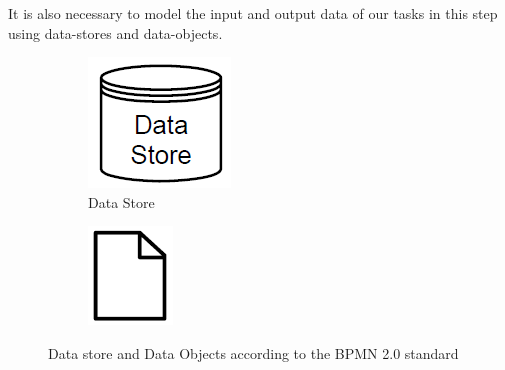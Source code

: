 It is also necessary to model the input and output data of our tasks in this step using \gls{data-store}s and \gls{data-object}s. 

\begin{figure}[H]
	\centering
	\begin{subfigure}[b]{0.18\columnwidth}
	\centering
	\includegraphics[width=0.9\columnwidth]{graphics/data-store}
	\caption{Data Store} 
	\label{fig:datastore} 
	\end{subfigure}
	\begin{subfigure}[b]{0.18\columnwidth}
		\centering
		\includegraphics[width=0.8\columnwidth]{graphics/data-object}
		\label{fig:dataobject}
	\end{subfigure}
	\caption{Data store and Data Objects according to the BPMN 2.0 standard \cite{bpmnstandard}} %
	\label{fig:datastoreandobject} %
\end{figure}

